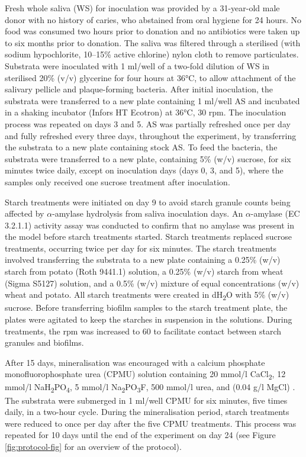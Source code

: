 \documentclass[utf8]{../templates/frontiersSCNS}
\begin{document}
Fresh whole saliva (WS) for inoculation was provided by a 31-year-old male donor
with no history of caries, who abstained from oral hygiene for 24 hours. No
food was consumed two hours prior to donation and no antibiotics were taken up
to six months prior to donation.
The saliva was filtered through a sterilised (with sodium hypochlorite, 10--15\% active chlorine)
nylon cloth to remove particulates.
Substrata were inoculated with 1 ml/well of a two-fold dilution of WS in sterilised
20\% (v/v) glycerine for four hours at 36°C, to allow attachment of the
salivary pellicle and plaque-forming bacteria. After initial inoculation, the
substrata were transferred to a new plate containing 1 ml/well AS and incubated
in a shaking incubator (Infors HT Ecotron) at 36°C, 30 rpm.
The inoculation process was repeated on days 3 and 5.
AS was partially refreshed once per day and fully refreshed every three days,
throughout the experiment, by transferring the substrata to a new plate containing
stock AS. To feed the bacteria, the substrata were transferred to a new plate, containing
5\% (w/v) sucrose, for six minutes twice daily, except on inoculation days
(days 0, 3, and 5), where the samples only received one sucrose treatment after
inoculation.

Starch treatments were initiated on day 9 to avoid starch granule counts being
affected by \(\alpha\)-amylase hydrolysis from saliva inoculation days.
An \(\alpha\)-amylase (EC 3.2.1.1) activity
assay was conducted to confirm that no amylase was present in the model before
starch treatments started. Starch treatments replaced sucrose treatments, occurring twice per day
for six minutes. The starch treatments involved transferring the substrata to a
new plate containing a 0.25\% (w/v) starch from potato (Roth 9441.1) solution, a 0.25\% (w/v) starch from wheat (Sigma S5127) solution, and a 0.5\% (w/v) mixture of equal
concentrations (w/v) wheat and potato. All starch treatments were created in dH\textsubscript{2}O
with 5\% (w/v) sucrose. Before transferring biofilm samples to the starch treatment
plate, the plates were agitated to keep the starches in suspension in the
solutions. During treatments, the rpm was increased to 60 to facilitate contact
between starch granules and biofilms.

After 15 days, mineralisation was encouraged with a
calcium phosphate monofluorophosphate urea (CPMU) solution containing
20 mmol/l CaCl\textsubscript{2}, 12 mmol/l NaH\textsubscript{2}PO\textsubscript{4}, 5 mmol/l Na\textsubscript{2}PO\textsubscript{3}F, 500 mmol/l urea,
and (0.04 g/l MgCl)
\citep{pearceConcomitantDeposition1987, sissonsMultistationPlaque1991}.
The substrata were submerged in 1 ml/well CPMU for six minutes, five times
daily, in a two-hour cycle. During the mineralisation period, starch treatments
were reduced to once per day after the five CPMU treatments. This process was repeated
for 10 days until the end of the experiment on day 24
(see Figure \ref{fig:protocol-fig} for an overview of the protocol).
\end{document}
